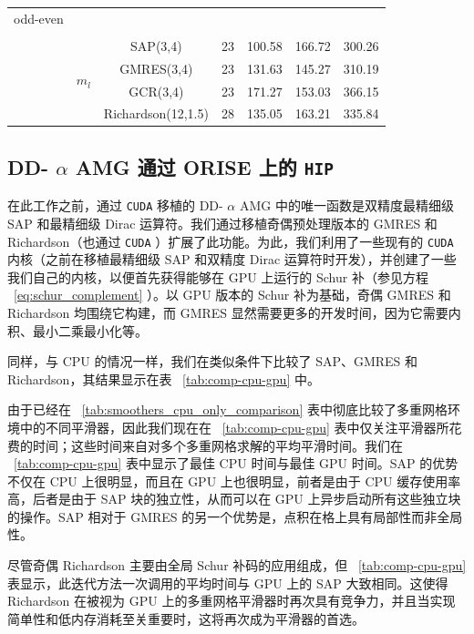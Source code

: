 \documentclass[5p,times,a4paper,fleqn]{cas-dc}
\begin{document}
\begin{table}[h]
\begin{tabular}{ccccccc}
     odd-even     &&&&&& \\ [-1.5ex]
     \cline{2-7}
          &&&&&& \\ [-1.5ex]
          &         & SAP(3,4)        & 23  & 100.58  & 166.72  & 300.26   \\ 
          & \multirow{2}{*}{        $m_{l}$        }         & GMRES(3,4)      & 23  & 131.63  & 145.27  & 310.19   \\ 
          &    
          & GCR(3,4)         & 23  & 171.27   & 153.03   & 366.15    \\           
          &         & Richardson(12,1.5) & 28   & 135.05  & 163.21 & 335.84       \\   
          \hline
   \end{tabular}
   \end{table}     

   \subsection{DD-    $\alpha$    AMG 通过 ORISE 上的    \texttt{HIP}     }       \label{subsect:ddalphaamg_on_orise_results}     

在此工作之前，通过    \texttt{CUDA}    移植的 DD-    $\alpha$    AMG 中的唯一函数是双精度最精细级 SAP 和最精细级 Dirac 运算符。我们通过移植奇偶预处理版本的 GMRES 和 Richardson（也通过    \texttt{CUDA}    ）扩展了此功能。为此，我们利用了一些现有的    \texttt{CUDA}    内核（之前在移植最精细级 SAP 和双精度 Dirac 运算符时开发），并创建了一些我们自己的内核，以便首先获得能够在 GPU 上运行的 Schur 补（参见方程 \     \ref{eq:schur_complement}   ）。以 GPU 版本的 Schur 补为基础，奇偶 GMRES 和 Richardson 均围绕它构建，而 GMRES 显然需要更多的开发时间，因为它需要内积、最小二乘最小化等。  

同样，与 CPU 的情况一样，我们在类似条件下比较了 SAP、GMRES 和 Richardson，其结果显示在表 \     \ref{tab:comp-cpu-gpu}    中。  

由于已经在 \     \ref{tab:smoothers_cpu_only_comparison}    表中彻底比较了多重网格环境中的不同平滑器，因此我们现在在 \     \ref{tab:comp-cpu-gpu}    表中仅关注平滑器所花费的时间；这些时间来自对多个多重网格求解的平均平滑时间。我们在 \     \ref{tab:comp-cpu-gpu}    表中显示了最佳 CPU 时间与最佳 GPU 时间。SAP 的优势不仅在 CPU 上很明显，而且在 GPU 上也很明显，前者是由于 CPU 缓存使用率高，后者是由于 SAP 块的独立性，从而可以在 GPU 上异步启动所有这些独立块的操作。SAP 相对于 GMRES 的另一个优势是，点积在格上具有局部性而非全局性。  

尽管奇偶 Richardson 主要由全局 Schur 补码的应用组成，但 \     \ref{tab:comp-cpu-gpu}    表显示，此迭代方法一次调用的平均时间与 GPU 上的 SAP 大致相同。这使得 Richardson 在被视为 GPU 上的多重网格平滑器时再次具有竞争力，并且当实现简单性和低内存消耗至关重要时，这将再次成为平滑器的首选。  
\end{document}
